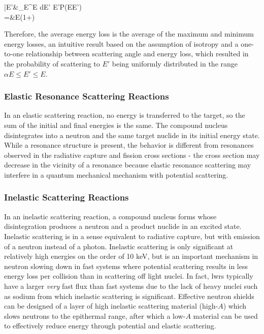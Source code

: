 \beqa
\bar{E'}\equiv&\int_{\alpha E}^E dE' E'P(E\rightarrow E')\\
=&E(1+\alpha)
\eeqa

Therefore, the average energy loss is the average of the maximum and minimum energy losses, an intuitive result based on the assumption of isotropy and a one-to-one relationship between scattering angle and energy loss, which resulted in the probability of scattering to \(E'\) being uniformly distributed in the range \(\alpha E\leq E'\leq E\).

\subsubsection{Elastic Resonance Scattering Reactions}

In an elastic scattering reaction, no energy is transferred to the target, so the sum of the initial and final energies is the same. The compound nucleus disintegrates into a neutron and the same target nuclide in its initial energy state. While a resonance structure is present, the behavior is different from resonances observed in the radiative capture and fission cross sections - the cross section may decrease in the vicinity of a resonance because elastic resonance scattering may interfere in a quantum mechanical mechanism with potential scattering.

\subsubsection{Inelastic Scattering Reactions}

In an inelastic scattering reaction, a compound nucleus forms whose disintegration produces a neutron and a product nuclide in an excited state. Inelastic scattering is in a sense equivalent to radiative capture, but with emission of a neutron instead of a photon. Inelastic scattering is only significant at relatively high energies on the order of 10 keV, but is an important mechanism in neutron slowing down in fast systems where potential scattering results in less energy loss per collision than in scattering off light nuclei. In fact, \glspl{lwr} typically have a larger {\it very} fast flux than fast systems due to the lack of heavy nuclei such as sodium from which inelastic scattering is significant. Effective neutron shields can be designed of a layer of high inelastic scattering material (high-\(A\)) which slows neutrons to the epithermal range, after which a low-\(A\) material can be used to effectively reduce energy through potential and elastic scattering. 

